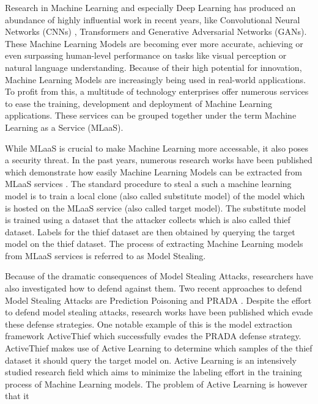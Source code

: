 Research in Machine Learning and especially Deep Learning has produced an abundance of highly influential work in recent years, like
Convolutional Neural Networks (CNNs) \cite{lecun1998gradient}, Transformers \cite{vaswani2017attention} and Generative Adversarial
Networks (GANs). These Machine Learning Models are becoming ever more accurate, achieving or even surpassing human-level performance
on tasks like visual perception or natural language understanding. Because of their high potential for innovation, Machine Learning
Models are increasingly being used in real-world applications. To profit from this, a multitude of technology enterprises offer numerous
services to ease the training, development and deployment of Machine Learning applications. These services can be grouped together under
the term Machine Learning as a Service (MLaaS). \par
While MLaaS is crucial to make Machine Learning more accessable, it also poses a security threat. In the past years, numerous research works
have been published which demonstrate how easily Machine Learning Models can be extracted from MLaaS services \cite{tramer2016stealing}
\cite{reith2019efficiently} \cite{papernot2017practical}. The standard procedure to steal a such a machine learning model is to train a local
clone (also called substitute model) of the model which is hosted on the MLaaS service (also called target model). The substitute model is trained
using a dataset that the attacker collects which is also called thief dataset. Labels for the thief dataset are then obtained by querying the target
model on the thief dataset. The process of extracting Machine Learning models from MLaaS services is referred to as Model Stealing. \par
Because of the dramatic consequences of Model Stealing Attacks, researchers have also investigated how to defend against them. Two recent approaches
to defend Model Stealing Attacks are Prediction Poisoning \cite{orekondy2019prediction} and PRADA \cite{juuti2019prada}. Despite the effort to
defend model stealing attacks, research works have been published which evade these defense strategies. One notable example of this is the model
extraction framework ActiveThief \cite{pal2020activethief} which successfully evades the PRADA defense strategy. ActiveThief makes use of Active
Learning to determine which samples of the thief dataset it should query the target model on. Active Learning is an intensively studied research
field which aims to minimize the labeling effort in the training process of Machine Learning models. The problem of Active Learning is however that it
